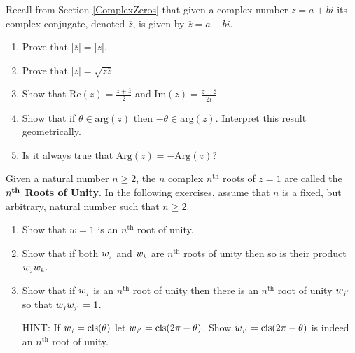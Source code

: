 \documentclass{ximera}
\begin{document}
\begin{problem}
Recall from Section \ref{ComplexZeros} that given a complex number $z = a+bi$ its complex conjugate, denoted $\overline{z}$, is given by $\overline{z} = a - bi$.

\begin{enumerate}

\item Prove that $\left| \overline{z} \right| = |z|$.

\item Prove that $|z| = \sqrt{z \overline{z}}$

\item Show that $\text{Re}(z) = \frac{z + \overline{z}}{2}$ and $\text{Im}(z) = \frac{z - \overline{z}}{2i}$

\item Show that if $\theta \in \text{arg}(z)$ then $-\theta \in \text{arg}\left(\overline{z}\right)$. Interpret this result geometrically.

 \item Is it always true that $\text{Arg}\left(\overline{z}\right) = -\text{Arg}(z)$?
\end{enumerate}

\end{problem}

\begin{problem}
Given a natural number $n \geq 2$, the $n$ complex $n^{\text{th}}$ roots of  $z = 1$ are called the \textbf{\boldmath $n^{\mbox{\textbf{\scriptsize th}}}$ Roots of Unity}.    In the following exercises, assume that $n$ is a fixed, but arbitrary, natural number such that $n \geq 2$.

\begin{enumerate}

\item Show that $w = 1$ is an $n^{\text{th}}$ root of unity.

\item Show that if both $w_{\text{\tiny$j$}}$ and $w_{\text{\tiny$k$}}$ are $n^{\text{th}}$ roots of unity then so is their product $w_{\text{\tiny$j$}}w_{\text{\tiny$k$}}$.

\item Show that if $w_{\text{\tiny$j$}}$ is an $n^{\text{th}}$ root of unity then there is an $n^{\text{th}}$ root of unity $w_{\text{\tiny$j'$}}$  so that  $w_{\text{\tiny$j$}}w_{\text{\tiny$j'$}} = 1$. 



 HINT: If $w_{\text{\tiny$j$}} = \text{cis}(\theta)$ let $w_{\text{\tiny$j'$}} = \text{cis}(2\pi - \theta)$. Show $w_{\text{\tiny$j'$}} = \text{cis}(2\pi - \theta)$ is indeed an $n^{\text{th}}$ root of unity.

\end{enumerate}

\end{problem}
\end{document}
